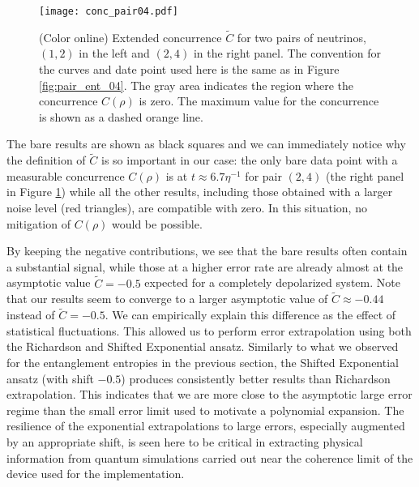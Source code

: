 \documentclass[10pt]{article}
\begin{document}
\begin{figure}[tbh]
 \centering
 \texttt{[image: conc\_pair04.pdf]}
 \caption{(Color online) Extended concurrence $\widetilde{C}$ for two pairs of neutrinos, $(1,2)$ in the left and $(2,4)$ in the right panel. The convention for the curves and date point used here is the same as in Figure \ref{fig:pair_ent_04}. The gray area indicates the region where the concurrence $C(\rho)$ is zero. The maximum value for the concurrence is shown as a dashed orange line.}
\label{fig:conc_pair_04}
\end{figure}


The bare results are shown as black squares and we can immediately notice why the definition of $\widetilde{C}$ is so important in our case: the only bare data point with a measurable concurrence $C(\rho)$ is at $t\approx6.7\eta^{-1}$ for pair $(2,4)$ (the right panel in Figure \ref{fig:conc_pair_04}) while all the other results, including those obtained with a larger noise level (red triangles), are compatible with zero. In this situation, no mitigation of $C(\rho)$ would be possible.

By keeping the negative contributions, we see that the bare results often contain a substantial signal, while those at a higher error rate are already almost at the asymptotic value $\widetilde{C}=-0.5$ expected for a completely depolarized system. Note that our results seem to converge to a larger asymptotic value of $\widetilde{C}\approx-0.44$ instead of $\widetilde{C}=-0.5$. We can empirically explain this difference as the effect of statistical fluctuations. This allowed us to perform error extrapolation using both the Richardson and Shifted Exponential ansatz. Similarly to what we observed for the entanglement entropies in the previous section, the Shifted Exponential ansatz (with shift $-0.5$) produces consistently better results than Richardson extrapolation. This indicates that we are more close to the asymptotic large error regime than the small error limit used to motivate a polynomial expansion. The resilience of the exponential extrapolations to large errors, especially augmented by an appropriate shift, is seen here to be critical in extracting physical information from quantum simulations carried out near the coherence limit of the device used for the implementation.    

\end{document}
